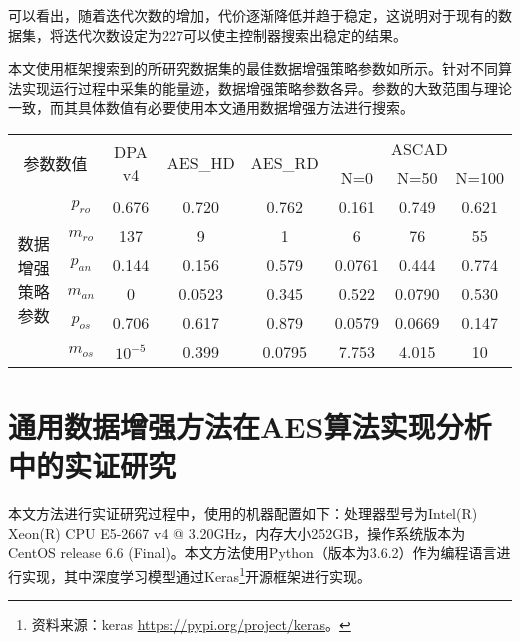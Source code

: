 {	可以看出，随着迭代次数的增加，代价逐渐降低并趋于稳定，这说明对于现有的数据集，将迭代次数设定为227可以使主控制器搜索出稳定的结果。
	
	本文使用框架搜索到的所研究数据集的最佳数据增强策略参数如所示。针对不同算法实现运行过程中采集的能量迹，数据增强策略参数各异。参数的大致范围与理论一致，而其具体数值有必要使用本文通用数据增强方法进行搜索。
	
	\begin{table}[!h]
		\label{tab:paras}
		\centering
		\small 
		\begin{tabular}{cc|cccccc}
			\hline
			\multicolumn{2}{c|}{\multirow{2}{*}{参数数值}} &\multirow{2}{*}{DPA v4}&\multirow{2}{*}{AES\_HD}&\multirow{2}{*}{AES\_RD}& \multicolumn{3}{c}{ASCAD} \\
			\multicolumn{2}{c|}{}&&&&N=0 & N=50 & N=100 \\
			\hline
			\multirow{6}{*}{数据增强策略参数}
			&$p_{ro}$&0.676&0.720&0.762&0.161&0.749&0.621\\
			&$m_{ro}$&137&9&1&6&76&55\\
			&$p_{an}$&0.144&0.156&0.579&0.0761&0.444&0.774\\
			&$m_{an}$&   0&0.0523&0.345&0.522&0.0790&0.530\\
			&$p_{os}$&0.706&0.617&0.879&0.0579&0.0669&0.147\\
			&$m_{os}$&$10^{-5}$&0.399&0.0795&7.753&4.015&10\\
			\hline
			
		\end{tabular}   
	\end{table}

	\section{通用数据增强方法在AES算法实现分析中的实证研究}\label{sec:realexp}
	
	本文方法进行实证研究过程中，使用的机器配置如下：处理器型号为Intel(R) Xeon(R) CPU E5-2667 v4 @ 3.20GHz，内存大小252GB，操作系统版本为CentOS release 6.6 (Final)。本文方法使用Python（版本为3.6.2）作为编程语言进行实现，其中深度学习模型通过Keras\footnote{资料来源：keras \href{https://pypi.org/project/keras}{https://pypi.org/project/keras}。}开源框架进行实现。

}
